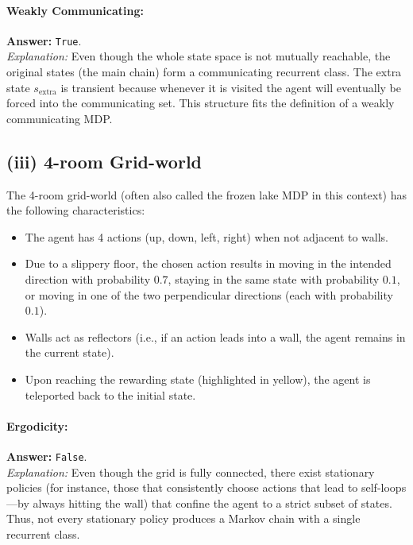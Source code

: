 \paragraph{Weakly Communicating:}  
\textbf{Answer:} \texttt{True}.\\[0.5em]
\textit{Explanation:}  
Even though the whole state space is not mutually reachable, the original states (the main chain) form a communicating recurrent class. The extra state $s_{\text{extra}}$ is transient because whenever it is visited the agent will eventually be forced into the communicating set. This structure fits the definition of a weakly communicating MDP.

\medskip

\subsection*{(iii) 4-room Grid-world}

The 4-room grid-world (often also called the frozen lake MDP in this context) has the following characteristics:
\begin{itemize}
    \item The agent has 4 actions (up, down, left, right) when not adjacent to walls.
    \item Due to a slippery floor, the chosen action results in moving in the intended direction with probability $0.7$, staying in the same state with probability $0.1$, or moving in one of the two perpendicular directions (each with probability $0.1$).
    \item Walls act as reflectors (i.e., if an action leads into a wall, the agent remains in the current state).
    \item Upon reaching the rewarding state (highlighted in yellow), the agent is teleported back to the initial state.
\end{itemize}

\paragraph{Ergodicity:}  
\textbf{Answer:} \texttt{False}.\\[0.5em]
\textit{Explanation:}  
Even though the grid is fully connected, there exist stationary policies (for instance, those that consistently choose actions that lead to self-loops—by always hitting the wall) that confine the agent to a strict subset of states. Thus, not every stationary policy produces a Markov chain with a single recurrent class.

